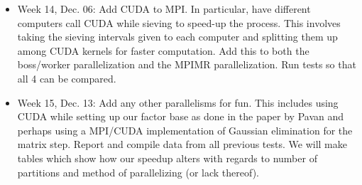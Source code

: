 \documentclass[11pt]{article}
\begin{document}
\begin{itemize}
 \item Week 14, Dec. 06: Add CUDA to MPI. In particular, have different computers call CUDA while sieving to speed-up the process. This involves taking the sieving intervals given to each computer and splitting them up among CUDA kernels for faster computation. Add this to both the boss/worker parallelization and the MPIMR parallelization. Run tests so that all 4 can be compared.
 \item Week 15, Dec. 13: Add any other parallelisms for fun. This includes using CUDA while setting up our factor base as done in the paper by Pavan and perhaps using a MPI/CUDA implementation of Gaussian elimination for the matrix step. Report and compile data from all previous tests. We will make tables which show how our speedup alters with regards to number of partitions and method of parallelizing (or lack thereof).
\end{itemize}
\end{document}
